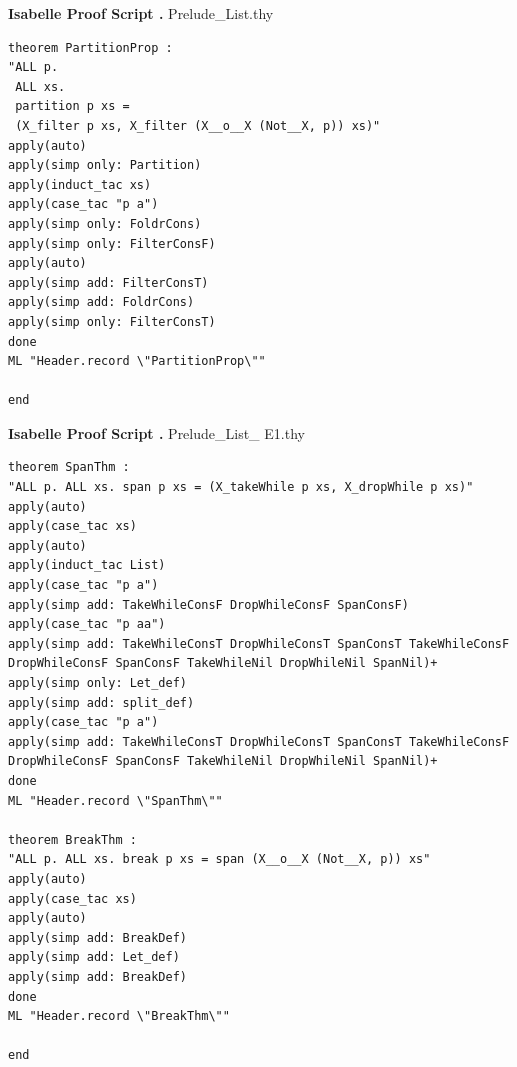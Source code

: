 \documentclass[12pt,twoside]{article}
\numberwithin{spec}{subsection}
\numberwithin{proof}{subsection}
\numberwithin{figure}{subsection}
\numberwithin{code}{subsection}
\begin{document}
\begin{multicols}{2}
\addtocounter{appindex}{1}
\large{\textbf{Isabelle Proof Script \thesection{}.\theappindex{}} Prelude\_List.thy}
\label{pscript:List}
\tiny
\begin{verbatim}
theorem PartitionProp :
"ALL p.
 ALL xs.
 partition p xs =
 (X_filter p xs, X_filter (X__o__X (Not__X, p)) xs)"
apply(auto)
apply(simp only: Partition)
apply(induct_tac xs)
apply(case_tac "p a")
apply(simp only: FoldrCons)
apply(simp only: FilterConsF)
apply(auto)
apply(simp add: FilterConsT)
apply(simp add: FoldrCons)
apply(simp only: FilterConsT)
done
ML "Header.record \"PartitionProp\""

end
\end{verbatim}
\end{multicols}

\begin{multicols}{2}
\addtocounter{appindex}{1}
\large{\textbf{Isabelle Proof Script \thesection{}.\theappindex{}} Prelude\_List\_ E1.thy}
\label{pscript:ListE1}
\tiny
\begin{verbatim}
theorem SpanThm :
"ALL p. ALL xs. span p xs = (X_takeWhile p xs, X_dropWhile p xs)"
apply(auto)
apply(case_tac xs)
apply(auto)
apply(induct_tac List)
apply(case_tac "p a")
apply(simp add: TakeWhileConsF DropWhileConsF SpanConsF)
apply(case_tac "p aa")
apply(simp add: TakeWhileConsT DropWhileConsT SpanConsT TakeWhileConsF
DropWhileConsF SpanConsF TakeWhileNil DropWhileNil SpanNil)+
apply(simp only: Let_def)
apply(simp add: split_def)
apply(case_tac "p a")
apply(simp add: TakeWhileConsT DropWhileConsT SpanConsT TakeWhileConsF
DropWhileConsF SpanConsF TakeWhileNil DropWhileNil SpanNil)+
done
ML "Header.record \"SpanThm\""

theorem BreakThm :
"ALL p. ALL xs. break p xs = span (X__o__X (Not__X, p)) xs"
apply(auto)
apply(case_tac xs)
apply(auto)
apply(simp add: BreakDef)
apply(simp add: Let_def)
apply(simp add: BreakDef)
done
ML "Header.record \"BreakThm\""

end
\end{verbatim}
\end{multicols}
\end{document}
